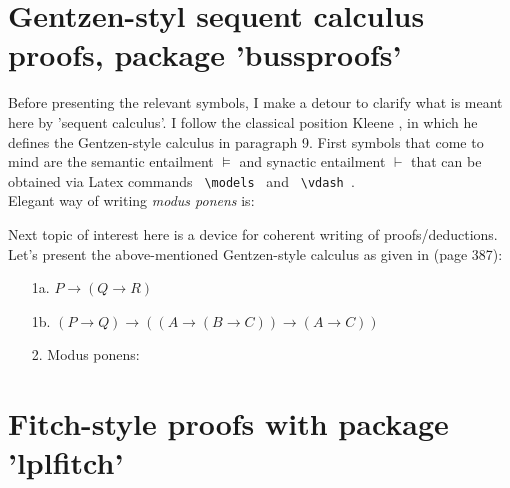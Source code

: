 \documentclass[12pt]{article}
\begin{document}
\section{Gentzen-styl sequent calculus proofs, package 'bussproofs'}
Before presenting the relevant symbols, I make a detour to clarify what is meant here by 'sequent calculus'. I follow the classical position Kleene \cite{kleene_math_logic}, in which he defines the Gentzen-style calculus in paragraph 9.
First symbols that come to mind are the semantic entailment $\models$ and synactic entailment $\vdash$ that can be obtained via Latex commands \verb+ \models +
and \verb+ \vdash +.
\\ \indent Elegant way of writing \textit{modus ponens} is:
\begin{prooftree}
\end{prooftree}
Next topic of interest here is a device for coherent writing of proofs/deductions. Let's present the above-mentioned Gentzen-style calculus as given in \cite{kleene_math_logic} (page 387):

\begin{enumerate}
\item[1a.] $ P \rightarrow (Q \rightarrow R)$
\item[1b.] $ (P \rightarrow Q) \rightarrow ( (A \rightarrow (B \rightarrow C )) \rightarrow (A \rightarrow C) ) $
\item[2.] Modus ponens:

\end{enumerate}

\section{Fitch-style proofs with package 'lplfitch'}



\end{document}
